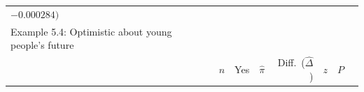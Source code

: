 \documentclass[11pt,a4paper,openany]{book}
\begin{document}
\begin{longtable}[]{@{}lrrrrrrr@{}}
\begin{minipage}[t]{0.07\columnwidth}
\(-0.000284)\)\strut
\end{minipage}\tabularnewline
\begin{minipage}[t]{0.35\columnwidth}\raggedright\strut
Example 5.4: Optimistic about young people's future\strut
\end{minipage} & \begin{minipage}[t]{0.05\columnwidth}\raggedleft\strut
\strut
\end{minipage} & \begin{minipage}[t]{0.04\columnwidth}\raggedleft\strut
\strut
\end{minipage} & \begin{minipage}[t]{0.06\columnwidth}\raggedleft\strut
\strut
\end{minipage} & \begin{minipage}[t]{0.11\columnwidth}\raggedleft\strut
\strut
\end{minipage} & \begin{minipage}[t]{0.05\columnwidth}\raggedleft\strut
\strut
\end{minipage} & \begin{minipage}[t]{0.05\columnwidth}\raggedleft\strut
\strut
\end{minipage} & \begin{minipage}[t]{0.07\columnwidth}\raggedleft\strut
\strut
\end{minipage}\tabularnewline
\begin{minipage}[t]{0.35\columnwidth}\raggedright\strut
\strut
\end{minipage} & \begin{minipage}[t]{0.05\columnwidth}\raggedleft\strut
\(n\)\strut
\end{minipage} & \begin{minipage}[t]{0.04\columnwidth}\raggedleft\strut
Yes\strut
\end{minipage} & \begin{minipage}[t]{0.06\columnwidth}\raggedleft\strut
\(\hat{\pi}\)\strut
\end{minipage} & \begin{minipage}[t]{0.11\columnwidth}\raggedleft\strut
Diff.~(\(\hat{\Delta}\))\strut
\end{minipage} & \begin{minipage}[t]{0.05\columnwidth}\raggedleft\strut
\(z\)\strut
\end{minipage} & \begin{minipage}[t]{0.05\columnwidth}\raggedleft\strut
\(P\)\strut
\end{minipage} & \begin{minipage}[t]{0.07\columnwidth}\raggedleft\strut

\end{minipage}
\end{longtable}
\end{document}
